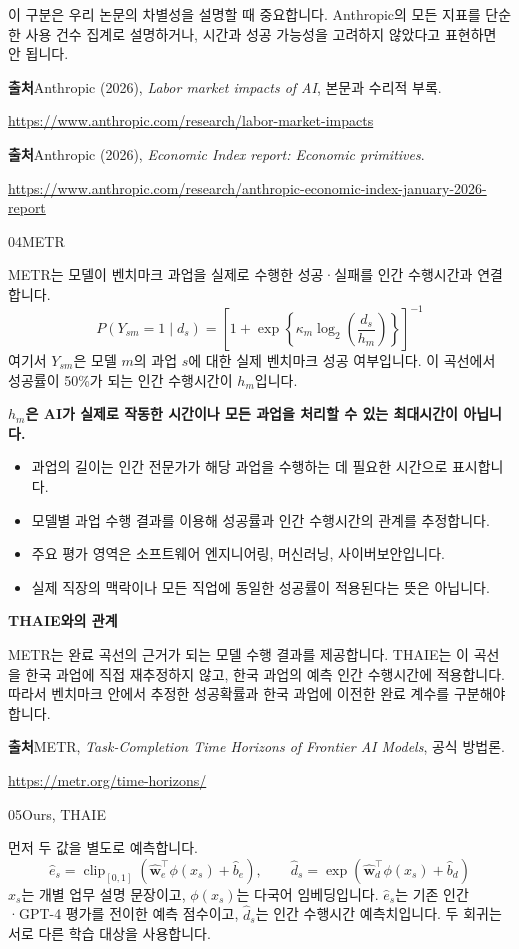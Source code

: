\documentclass[11pt,a4paper]{article}
\newcommand{\pagetitle}[2]{{\small\sffamily\color{ink}#1\par}\vspace{3mm}{\LARGE\bfseries #2\par}\vspace{4mm}}
\newcommand{\source}[2]{{\small\textbf{출처}\enspace #1\par\url{#2}\par}}
\begin{document}
이 구분은 우리 논문의 차별성을 설명할 때 중요합니다. Anthropic의 모든 지표를 단순한 사용 건수 집계로 설명하거나, 시간과 성공 가능성을 고려하지 않았다고 표현하면 안 됩니다.

\source{Anthropic (2026), \textit{Labor market impacts of AI}, 본문과 수리적 부록.}{https://www.anthropic.com/research/labor-market-impacts}
\source{Anthropic (2026), \textit{Economic Index report: Economic primitives}.}{https://www.anthropic.com/research/anthropic-economic-index-january-2026-report}

\newpage
\pagetitle{04\quad METR}{실제 벤치마크 성공으로 완료 곡선을 추정하는 방식}
METR는 모델이 벤치마크 과업을 실제로 수행한 성공·실패를 인간 수행시간과 연결합니다.
\[
P(Y_{sm}=1\mid d_s)=
\left[1+\exp\left\{
\kappa_m\log_2\left(\frac{d_s}{h_m}\right)
\right\}\right]^{-1}
\]
여기서 $Y_{sm}$은 모델 $m$의 과업 $s$에 대한 실제 벤치마크 성공 여부입니다. 이 곡선에서 성공률이 50\%가 되는 인간 수행시간이 $h_m$입니다.

\textbf{$h_m$은 AI가 실제로 작동한 시간이나 모든 과업을 처리할 수 있는 최대시간이 아닙니다.}

\begin{itemize}
\item 과업의 길이는 인간 전문가가 해당 과업을 수행하는 데 필요한 시간으로 표시합니다.
\item 모델별 과업 수행 결과를 이용해 성공률과 인간 수행시간의 관계를 추정합니다.
\item 주요 평가 영역은 소프트웨어 엔지니어링, 머신러닝, 사이버보안입니다.
\item 실제 직장의 맥락이나 모든 직업에 동일한 성공률이 적용된다는 뜻은 아닙니다.
\end{itemize}

\textbf{THAIE와의 관계}\par
METR는 완료 곡선의 근거가 되는 모델 수행 결과를 제공합니다. THAIE는 이 곡선을 한국 과업에 직접 재추정하지 않고, 한국 과업의 예측 인간 수행시간에 적용합니다. 따라서 벤치마크 안에서 추정한 성공확률과 한국 과업에 이전한 완료 계수를 구분해야 합니다.

\source{METR, \textit{Task-Completion Time Horizons of Frontier AI Models}, 공식 방법론.}{https://metr.org/time-horizons/}

\newpage
\pagetitle{05\quad Ours, THAIE}{기존 평가 점수에 이전된 완료 곡선을 적용하는 방식}
먼저 두 값을 별도로 예측합니다.
\[
\hat e_s=\operatorname{clip}_{[0,1]}
\left(\hat{\mathbf w}_e^\top\phi(x_s)+\hat b_e\right),
\qquad
\hat d_s=\exp\left(\hat{\mathbf w}_d^\top\phi(x_s)+\hat b_d\right)
\]
$x_s$는 개별 업무 설명 문장이고, $\phi(x_s)$는 다국어 임베딩입니다. $\hat e_s$는 기존 인간·GPT-4 평가를 전이한 예측 점수이고, $\hat d_s$는 인간 수행시간 예측치입니다. 두 회귀는 서로 다른 학습 대상을 사용합니다.
\end{document}
